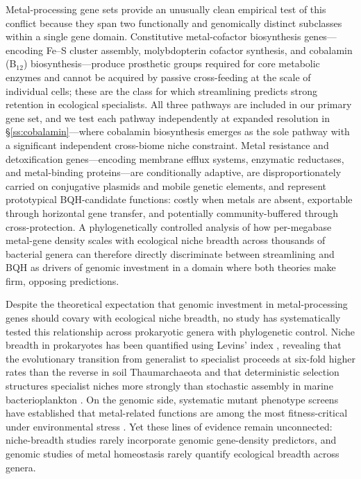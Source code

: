 \documentclass[times]{zHenriquesLab-StyleBioRxiv}
\begin{document}
Metal-processing gene sets provide an unusually clean empirical test of this
conflict because they span two functionally and genomically distinct subclasses
within a single gene domain. Constitutive metal-cofactor biosynthesis
genes---encoding Fe--S cluster assembly, molybdopterin cofactor synthesis, and
cobalamin (B$_{12}$) biosynthesis---produce prosthetic groups required for
core metabolic enzymes and cannot be acquired by passive cross-feeding at the
scale of individual cells; these are the class for which streamlining predicts
strong retention in ecological specialists. All three pathways are included in our
primary gene set, and we test each pathway independently at expanded resolution in
\S\ref{ss:cobalamin}---where cobalamin biosynthesis emerges as the sole pathway with
a significant independent cross-biome niche constraint. Metal resistance and detoxification
genes---encoding membrane efflux systems, enzymatic reductases, and
metal-binding proteins---are conditionally adaptive, are disproportionately
carried on conjugative plasmids and mobile genetic elements, and represent
prototypical BQH-candidate functions: costly when metals are absent,
exportable through horizontal gene transfer, and potentially
community-buffered through cross-protection. A phylogenetically controlled
analysis of how per-megabase metal-gene density scales with ecological niche
breadth across thousands of bacterial genera can therefore directly
discriminate between streamlining and BQH as drivers of genomic investment in
a domain where both theories make firm, opposing predictions.

Despite the theoretical expectation that genomic investment in metal-processing
genes should covary with ecological niche breadth, no study has systematically
tested this relationship across prokaryotic genera with phylogenetic control.
Niche breadth in prokaryotes has been quantified using Levins' index
\cite{levins1968,vonmeijenfeldt2023,muller2019}, revealing that the evolutionary transition from generalist
to specialist proceeds at six-fold higher rates than the reverse in soil
Thaumarchaeota \cite{szukics2024} and that deterministic selection structures
specialist niches more strongly than stochastic assembly in marine
bacterioplankton \cite{rastogi2023}. On the genomic side, systematic mutant
phenotype screens have established that metal-related functions are among the
most fitness-critical under environmental stress \cite{price2018}. Yet these
lines of evidence remain unconnected: niche-breadth studies rarely incorporate
genomic gene-density predictors, and genomic studies of metal homeostasis
rarely quantify ecological breadth across genera.
\end{document}
